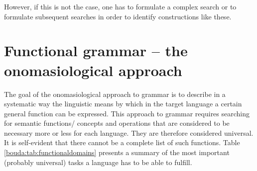 However, if this is not the case, one has to formulate a complex search or to formulate subsequent searches in order to identify constructions like these. 

\section{Functional grammar -- the onomasiological approach}
\label{bouda:sec:functionalgrammar}

The goal of the onomasiological approach to grammar is to describe in a systematic way the linguistic means by which in the target language a certain general function can be expressed. This approach to grammar requires searching for semantic functions/ concepts and operations that are considered to be necessary more or less for each language. They are therefore considered universal. It is self-evident that there cannot be a complete list of such functions. Table \ref{bouda:tab:functionaldomains} presents a summary of the most important (probably universal) tasks a language has to be able to fulfill. 
 

